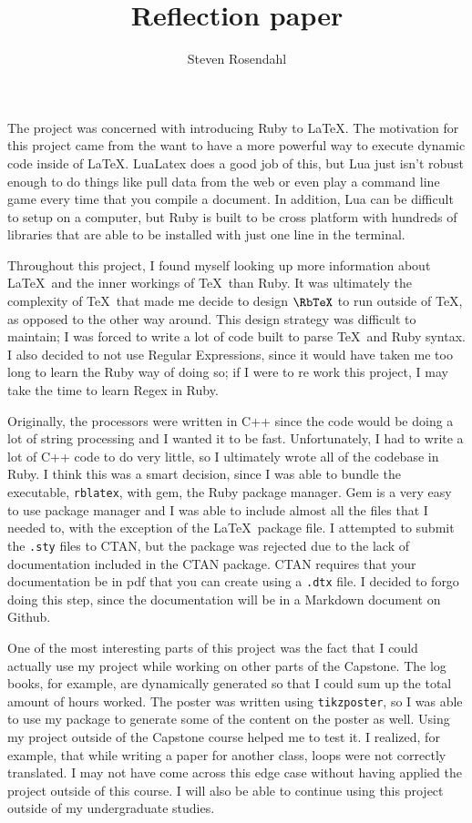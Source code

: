 \documentclass[11pt]{article}
\title{Reflection paper}
\author{Steven Rosendahl}
\date{}
\newcommand{\inlinecode}[1]{\texttt{#1}}
\begin{document}
\maketitle

The project was concerned with introducing Ruby to \LaTeX. The motivation for this project came from
the want to have a more powerful way to execute dynamic code inside of \LaTeX. LuaLatex does a good
job of this, but Lua just isn't robust enough to do things like pull data from the web or even play
a command line game every time that you compile a document. In addition, Lua can be difficult to
setup on a computer, but Ruby is built to be cross platform with hundreds of libraries that are
able to be installed with just one line in the terminal.

Throughout this project, I found myself looking up more information about \LaTeX\ and the inner workings of \TeX\ than Ruby. It was ultimately the complexity of \TeX\ that made me decide to design $\RbTeX$ to run outside of \TeX, as opposed to the other way around. This design strategy was difficult to maintain; I was forced to write a lot of code built to parse \TeX\ and Ruby syntax. I also decided to not use Regular Expressions, since it would have taken me too long to learn the Ruby way of doing so; if I were to re work this project, I may take the time to learn Regex in Ruby.

Originally, the processors were written in C++ since the code would be doing a lot of string processing and I wanted it to be fast. Unfortunately, I had to write a lot of C++ code to do very little, so I ultimately wrote all of the codebase in Ruby. I think this was a smart decision, since I was able to bundle the executable, \inlinecode{rblatex}, with gem, the Ruby package manager. Gem is a very easy to use package manager and I was able to include almost all the files that I needed to, with the exception of the \LaTeX\ package file. I attempted to submit the \inlinecode{.sty} files to CTAN, but the package was rejected due to the lack of documentation included in the CTAN package. CTAN requires that your documentation be in pdf that you can create using a \inlinecode{.dtx} file. I decided to forgo doing this step, since the documentation will be in a Markdown document on Github.

One of the most interesting parts of this project was the fact that I could actually use my project while working on other parts of the Capstone. The log books, for example, are dynamically generated so that I could sum up the total amount of hours worked. The poster was written using \inlinecode{tikzposter}, so I was able to use my package to generate some of the content on the poster as well. Using my project outside of the Capstone course helped me to test it. I realized, for example, that while writing a paper for another class, loops were not correctly translated. I may not have come across this edge case without having applied the project outside of this course. I will also be able to continue using this project outside of my undergraduate studies.
\end{document}
